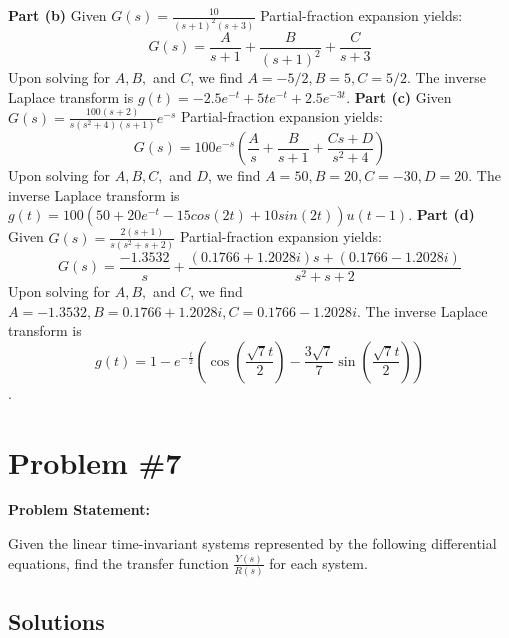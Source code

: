 \documentclass[12pt]{article}
\begin{document}
\textbf{Part (b)}
\newline
Given \( G(s) = \frac{10}{(s + 1)^2(s + 3)} \)
\newline
Partial-fraction expansion yields:
\[
G(s) = \frac{A}{s + 1} + \frac{B}{(s + 1)^2} + \frac{C}{s + 3}
\]
Upon solving for \( A, B, \) and \( C \), we find \( A = -5/2, B = 5, C = 5/2 \).
\newline
The inverse Laplace transform is \( g(t) = -2.5e^{-t} + 5te^{-t} + 2.5e^{-3t} \).
\newline \newline
\textbf{Part (c)}
\newline
Given \( G(s) = \frac{100(s + 2)}{s(s^2 + 4)(s + 1)}e^{-s} \)
\newline
Partial-fraction expansion yields:
\[
G(s) = 100e^{-s} \left( \frac{A}{s} + \frac{B}{s + 1} + \frac{Cs + D}{s^2 + 4} \right)
\]
Upon solving for \( A, B, C, \) and \( D \), we find \( A = 50, B = 20, C = -30, D = 20 \).
\newline
The inverse Laplace transform is \( g(t) = 100(50 + 20e^{-t} - 15cos(2t) + 10sin(2t))u(t-1) \).
\newline \newline
\textbf{Part (d)}
\newline
Given \(G(s) = \frac{2(s + 1)}{s(s^2 + s + 2)}\)
\newline
Partial-fraction expansion yields:
\[
G(s) = \frac{-1.3532}{s} + \frac{(0.1766 + 1.2028i)s + (0.1766 - 1.2028i)}{s^2 + s + 2}
\]
Upon solving for \( A, B, \) and \( C \), we find \( A = -1.3532, B = 0.1766 + 1.2028i, C = 0.1766 - 1.2028i \).
\newline
The inverse Laplace transform is 
\[
g(t) = 1 - e^{-\frac{t}{2}} \left( \cos\left(\frac{\sqrt{7}t}{2}\right) - \frac{3\sqrt{7}}{7} \sin\left(\frac{\sqrt{7}t}{2}\right) \right)
\].


\newpage
\section*{Problem \#7}

\textbf{Problem Statement:}

Given the linear time-invariant systems represented by the following differential equations, find the transfer function \( \frac{Y(s)}{R(s)} \) for each system.

\subsection*{Solutions}
\end{document}
